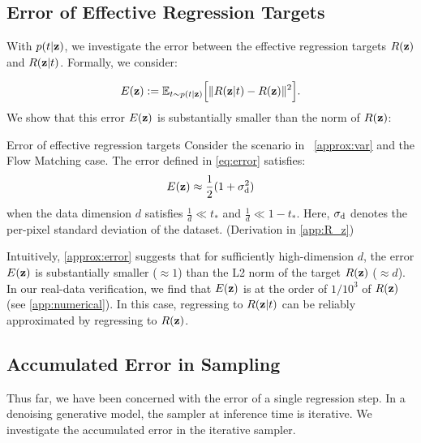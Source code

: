 \subsection{Error of Effective Regression Targets}\label{subsec:error_effective}


With $p(t|{\mathbf{z}})$, we investigate the error between the effective regression targets $R({\mathbf{z}})$ and $R({\mathbf{z}}|t)$. Formally, we consider:

\vskip -15pt

\begin{align}\label{eq:error}
 E({\mathbf{z}}):=\mathbb{E}_{t\sim p(t|{\mathbf{z}})}\Big[\|R({\mathbf{z}}|t)-R({\mathbf{z}})\|^2\Big].
\end{align}
We show that this error $E({\mathbf{z}})$ is substantially smaller than the norm of $R({\mathbf{z}})$:




\begin{statement}{Error of effective regression targets}\label{approx:error}
Consider the scenario in ~\cref{approx:var} and the Flow Matching case. The error defined in \cref{eq:error} satisfies:
\begin{align}\label{eq:approx2}
 E({\mathbf{z}}) \approx \frac{1}{2}(1+\sigma_{\mathop{}\!\mathrm{d}}^2)
\end{align}
when the data dimension $d$ satisfies $\frac{1}{d} \ll t_*$ and $\frac{1}{d} \ll 1-t_*$. Here, $\sigma_{\mathop{}\!\mathrm{d}}$ denotes the per-pixel standard deviation of the dataset.
(Derivation in \cref{app:R_z})
\end{statement}


Intuitively, \cref{approx:error} suggests that for sufficiently high-dimension $d$, the error $E({\mathbf{z}})$ is substantially smaller (${\approx}1$) than the L2 norm of the target $R({\mathbf{z}})$ (${\approx}d$). In our real-data verification, we find that $E({\mathbf{z}})$ is at the order of $1/10^3$ of $R({\mathbf{z}})$ (see \cref{app:numerical}). In this case, regressing to $R({\mathbf{z}}|t)$ can be reliably approximated by regressing to $R({\mathbf{z}})$.



\subsection{Accumulated Error in Sampling}\label{subsec:final}

Thus far, we have been concerned with the error of a single regression step. In a denoising generative model, the sampler at inference time is iterative. We investigate the accumulated error in the iterative sampler.


